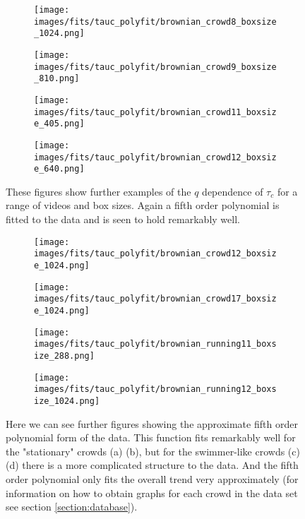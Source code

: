 \documentclass[10pt]{article}
\begin{document}
\begin{figure}[H]
\begin{subfigure}[t]{.5\textwidth}
  \centering
 \texttt{[image: images/fits/tauc\_polyfit/brownian\_crowd8\_boxsize\_1024.png]}
  \caption{}
\end{subfigure}%
\hfill
\begin{subfigure}[t]{.5\textwidth}
  \centering
  \texttt{[image: images/fits/tauc\_polyfit/brownian\_crowd9\_boxsize\_810.png]}
  \caption{}
\end{subfigure}
\par\bigskip
\begin{subfigure}[t]{.5\textwidth}
  \centering
 \texttt{[image: images/fits/tauc\_polyfit/brownian\_crowd11\_boxsize\_405.png]}
  \caption{}
\end{subfigure}%
\hfill
\begin{subfigure}[t]{.5\textwidth}
  \centering
  \texttt{[image: images/fits/tauc\_polyfit/brownian\_crowd12\_boxsize\_640.png]}
  \caption{}
\end{subfigure}
\caption{These figures show further examples of the $q$ dependence of $\tau_c$ for a range of videos and box sizes. Again a fifth order polynomial is fitted to the data and is seen to hold remarkably well.}
\label{fig:tauc_polyfit2}
\end{figure}

\begin{figure}[H]
\begin{subfigure}[t]{.5\textwidth}
  \centering
 \texttt{[image: images/fits/tauc\_polyfit/brownian\_crowd12\_boxsize\_1024.png]}
  \caption{}
\end{subfigure}%
\hfill
\begin{subfigure}[t]{.5\textwidth}
  \centering
  \texttt{[image: images/fits/tauc\_polyfit/brownian\_crowd17\_boxsize\_1024.png]}
  \caption{}
\end{subfigure}
\par\bigskip
\begin{subfigure}[t]{.5\textwidth}
  \centering
 \texttt{[image: images/fits/tauc\_polyfit/brownian\_running11\_boxsize\_288.png]}
  \caption{}
\end{subfigure}%
\hfill
\begin{subfigure}[t]{.5\textwidth}
  \centering
  \texttt{[image: images/fits/tauc\_polyfit/brownian\_running12\_boxsize\_1024.png]}
  \caption{}
\end{subfigure}
\caption{Here we can see further figures showing the approximate fifth order polynomial form of the data. This function fits remarkably well for the "stationary" crowds (a) (b), but for the swimmer-like crowds (c) (d) there is a more complicated structure to the data. And the fifth order polynomial only fits the overall trend very approximately (for information on how to obtain graphs for each crowd in the data set see section \ref{section:database}).}
\label{fig:tauc_polyfit3}
\end{figure}
\end{document}
